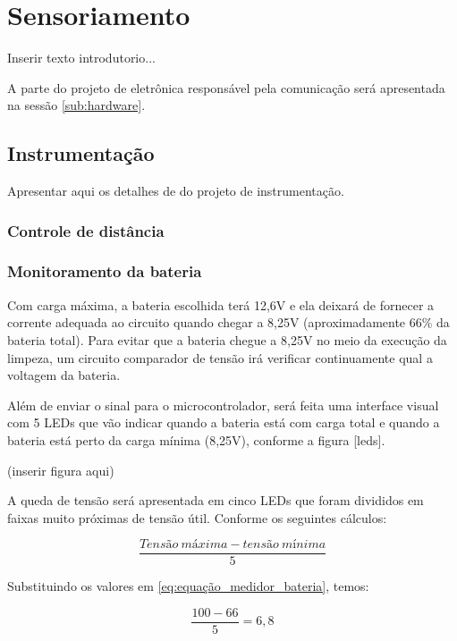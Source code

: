 \section{Sensoriamento} %
\label{sec:sensoriamento2}

	Inserir texto introdutorio...

	A parte do projeto de eletrônica responsável pela comunicação será apresentada na sessão \ref{sub:hardware}.

	\subsection{Instrumentação} %
	\label{sub:instrumentação2}

		Apresentar aqui os detalhes de do projeto de instrumentação.

		\subsubsection{Controle de distância}

		\subsubsection{Monitoramento da bateria}
		Com carga máxima, a bateria escolhida terá 12,6V e ela deixará de fornecer a corrente adequada ao circuito quando chegar a 8,25V (aproximadamente 66\% da bateria total). Para evitar que a bateria chegue a 8,25V no meio da execução da limpeza, um circuito comparador de tensão irá verificar continuamente qual a voltagem da bateria.

		Além de enviar o sinal para o microcontrolador, será feita uma interface visual com 5 LEDs que vão indicar quando a bateria está com carga total e quando a bateria está perto da carga mínima (8,25V), conforme a figura [leds].

		(inserir figura aqui)

		A queda de tensão será apresentada em cinco LEDs que foram divididos em faixas muito próximas de tensão útil. Conforme os seguintes cálculos:

		\begin{equation}
		\label{eq:equação_medidor_bateria}
			\frac{Tensão\ máxima - tensão\ mínima}{5}  
		\end{equation}

		Substituindo os valores em \ref{eq:equação_medidor_bateria}, temos:

		\begin{equation}
		\label{eq:equação_medidor_bateria_2}
			\frac{100-66}{5} = 6,8  
		\end{equation}

